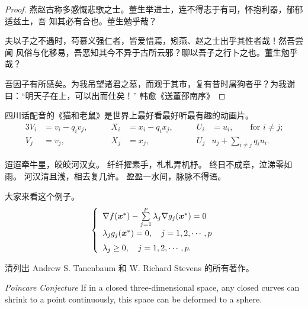 \begin{proof}
燕赵古称多感慨悲歌之士。董生举进士，连不得志于有司，怀抱利器，郁郁适兹土，吾
知其必有合也。董生勉乎哉？

夫以子之不遇时，苟慕义强仁者，皆爱惜焉，矧燕、赵之士出乎其性者哉！然吾尝闻
风俗与化移易，吾恶知其今不异于古所云邪？聊以吾子之行卜之也。董生勉乎哉？

吾因子有所感矣。为我吊望诸君之墓，而观于其市，复有昔时屠狗者乎？为我谢
曰：“明天子在上，可以出而仕矣！” \hfill\pozhehao 韩愈《送董邵南序》
\end{proof}

\begin{corollary}
  四川话配音的《猫和老鼠》是世界上最好看最好听最有趣的动画片。
\begin{alignat}{3}
V_i & =v_i - q_i v_j, & \qquad X_i & = x_i - q_i x_j,
 & \qquad U_i & = u_i,
 \qquad \text{for $i\ne j$;}\label{eq:B}\\
V_j & = v_j, & \qquad X_j & = x_j,
  & \qquad U_j & u_j + \sum_{i\ne j} q_i u_i.
\end{alignat}
\end{corollary}

迢迢牵牛星，皎皎河汉女。
纤纤擢素手，札札弄机杼。
终日不成章，泣涕零如雨。
河汉清且浅，相去复几许。
盈盈一水间，脉脉不得语。

\begin{example}
  大家来看这个例子。
\begin{equation}
\label{ktc}
\left\{\begin{array}{l}
\nabla f({\mbox{\boldmath $x$}}^*)-\sum\limits_{j=1}^p\lambda_j\nabla g_j({\mbox{\boldmath $x$}}^*)=0\\[0.3cm]
\lambda_jg_j({\mbox{\boldmath $x$}}^*)=0,\quad j=1,2,\cdots,p\\[0.2cm]
\lambda_j\ge 0,\quad j=1,2,\cdots,p.
\end{array}\right.
\end{equation}
\end{example}

\begin{exercise}
  清列出 Andrew S. Tanenbaum 和 W. Richard Stevens 的所有著作。
\end{exercise}

\begin{conjecture} \textit{Poincare Conjecture} If in a closed three-dimensional
  space, any closed curves can shrink to a point continuously, this space can be
  deformed to a sphere.
\end{conjecture}

